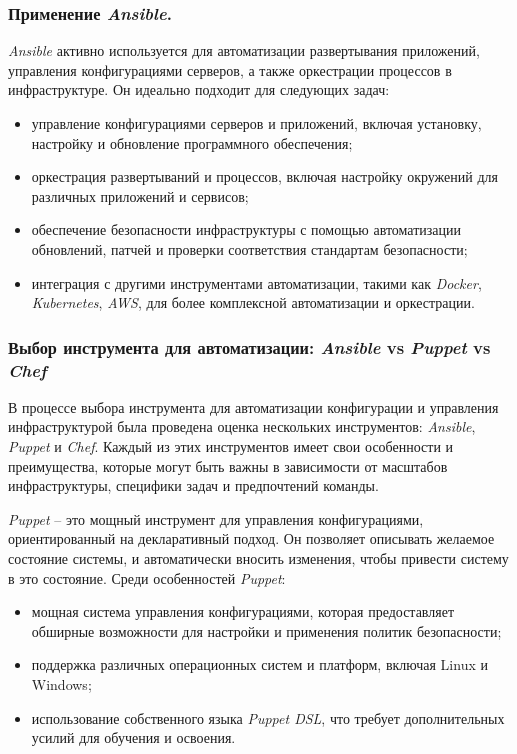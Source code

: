 \subsubsection{Применение \textit{Ansible}.}
\textit{Ansible} активно используется для автоматизации развертывания приложений, управления конфигурациями серверов, а также оркестрации процессов в инфраструктуре. Он идеально подходит для следующих задач:
\begin{itemize}
    \item управление конфигурациями серверов и приложений, включая установку, настройку и обновление программного обеспечения;
    \item оркестрация развертываний и процессов, включая настройку окружений для различных приложений и сервисов;
    \item обеспечение безопасности инфраструктуры с помощью автоматизации обновлений, патчей и проверки соответствия стандартам безопасности;
    \item интеграция с другими инструментами автоматизации, такими как \textit{Docker}, \textit{Kubernetes}, \textit{AWS}, для более комплексной автоматизации и оркестрации.
\end{itemize}

\subsubsection{Выбор инструмента для автоматизации: \textit{Ansible} vs \textit{Puppet} vs \textit{Chef}}
В процессе выбора инструмента для автоматизации конфигурации и управления инфраструктурой была проведена оценка нескольких инструментов: \textit{Ansible}, \textit{Puppet} и \textit{Chef}. Каждый из этих инструментов имеет свои особенности и преимущества, которые могут быть важны в зависимости от масштабов инфраструктуры, специфики задач и предпочтений команды.


\textit{Puppet} -- это мощный инструмент для управления конфигурациями, ориентированный на декларативный подход. Он позволяет описывать желаемое состояние системы, и автоматически вносить изменения, чтобы привести систему в это состояние. Среди особенностей \textit{Puppet}:
\begin{itemize}
    \item мощная система управления конфигурациями, которая предоставляет обширные возможности для настройки и применения политик безопасности;
    \item поддержка различных операционных систем и платформ, включая Linux и Windows;
    \item использование собственного языка \textit{Puppet DSL}, что требует дополнительных усилий для обучения и освоения.
\end{itemize}

